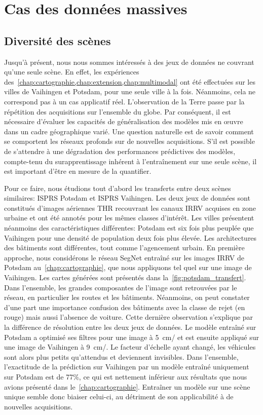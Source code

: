 \section{Cas des données massives}

\subsection{Diversité des scènes}

Jusqu'à présent, nous nous sommes intéressés à des jeux de données ne couvrant qu'une seule scène. En effet, les expériences des~\cref{chap:cartographie,chap:extension,chap:multimodal} ont été effectuées sur les villes de Vaihingen et Potsdam, pour une seule ville à la fois. Néanmoins, cela ne correspond pas à un cas applicatif réel. L'observation de la Terre passe par la répétition des acquisitions sur l'ensemble du globe. Par conséquent, il est nécessaire d'évaluer les capacités de généralisation des modèles mis en \oe{}uvre dans un cadre géographique varié. Une question naturelle est de savoir comment se comportent les réseaux profonds sur de nouvelles acquisitions. S'il est possible de s'attendre à une dégradation des performances prédictives des modèles, compte-tenu du surapprentissage inhérent à l'entraînement sur une seule scène, il est important d'être en mesure de la quantifier.

Pour ce faire, nous étudions tout d'abord les transferts entre deux scènes similaires: \gls{ISPRS} Potsdam et \gls{ISPRS} Vaihingen. Les deux jeux de données sont constitués d'images aériennes \gls{THR} recouvrant les canaux \gls{IRRV} acquises en zone urbaine et ont été annotés pour les mêmes classes d'intérêt. Les villes présentent néanmoins des caractéristiques différentes: Potsdam est six fois plus peuplée que Vaihingen pour une densité de population deux fois plus élevée. Les architectures des bâtiments sont différentes, tout comme l'agencement urbain. En première approche, nous considérons le réseau SegNet entraîné sur les images \gls{IRRV} de Potsdam au~\cref{chap:cartographie}, que nous appliquons tel quel sur une image de Vaihingen. Les cartes générées sont présentés dans la~\cref{fig:potsdam_transfert}. Dans l'ensemble, les grandes composantes de l'image sont retrouvées par le réseau, en particulier les routes et les bâtiments. Néanmoins, on peut constater d'une part une importance confusion des bâtiments avec la classe de rejet (en rouge) mais aussi l'absence de voiture. Cette dernière observation s'explique par la différence de résolution entre les deux jeux de données. Le modèle entraîné sur Potsdam a optimisé ses filtres pour une image à \SI{5}{\centi\meter/\px} et est ensuite appliqué sur une image de Vaihingen à \SI{9}{\centi\meter/\px}. Le facteur d'échelle ayant changé, les véhicules sont alors plus petits qu'attendus et deviennent invisibles. Dans l'ensemble, l'exactitude de la prédiction sur Vaihingen par un modèle entraîné uniquement sur Potsdam est de 77\%, ce qui est nettement inférieur aux résultats que nous avions présenté dans le~\cref{chap:cartographie}. Entraîner un modèle sur une scène unique semble donc biaiser celui-ci, au détriment de son applicabilité à de nouvelles acquisitions.

